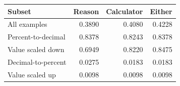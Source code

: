 \begin{tabular}{lrrr}
\toprule
Subset & Reason & Calculator & Either \\
\midrule
All examples & 0.3890 & 0.4080 & 0.4228 \\
Percent-to-decimal & 0.8378 & 0.8243 & 0.8378 \\
Value scaled down & 0.6949 & 0.8220 & 0.8475 \\
Decimal-to-percent & 0.0275 & 0.0183 & 0.0183 \\
Value scaled up & 0.0098 & 0.0098 & 0.0098 \\
\bottomrule
\end{tabular}
